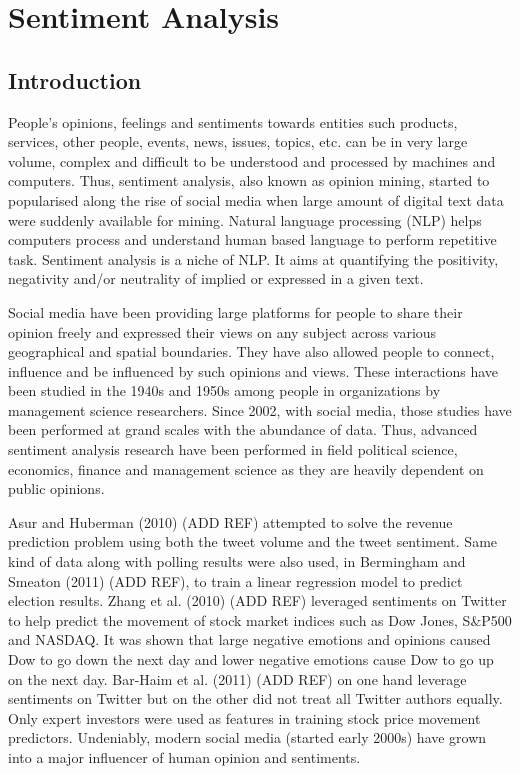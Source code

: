 \chapter{Sentiment Analysis}
\section{Introduction}
People's opinions, feelings and sentiments towards entities such products, services, other people, events, news, issues, topics, etc. can be in very large volume, complex and difficult to be understood and processed by machines and computers. Thus, sentiment analysis, also known as opinion mining, started to popularised along the rise of social media when large amount of digital text data were suddenly available for mining. Natural language processing (NLP) helps computers process and understand human based language to perform repetitive task. Sentiment analysis is a niche of NLP. It aims at quantifying the positivity, negativity and/or neutrality of implied or expressed in a given text.

Social media have been providing large platforms for people to share their opinion freely and expressed their views on any subject across various geographical and spatial  boundaries. They have also allowed people to connect, influence and be influenced by such opinions and views. These interactions have been studied in the 1940s and 1950s among people in organizations by management science researchers. Since 2002, with social media, those studies have been performed at grand scales with the abundance of data. Thus, advanced sentiment analysis research have been performed in field political science, economics, finance and management science as they are heavily dependent on public opinions. 

Asur and Huberman (2010) (ADD REF) attempted to solve the revenue prediction problem using both the tweet volume and the tweet sentiment. Same kind of data along with polling results were also used, in Bermingham and Smeaton (2011) (ADD REF), to train a linear regression model to predict election results. Zhang et al. (2010) (ADD REF) leveraged sentiments on Twitter to help predict the movement of stock market indices such as Dow Jones, S\&P500 and NASDAQ. It was shown that large negative emotions and opinions caused Dow to go down the next day and lower negative emotions cause Dow to go up on the next day. Bar-Haim et al. (2011) (ADD REF) on one hand leverage sentiments on Twitter but on the other did not treat all Twitter authors equally. Only expert investors were used as features in training stock price movement predictors. Undeniably, modern social media (started early 2000s) have grown into a major influencer of human opinion and sentiments.